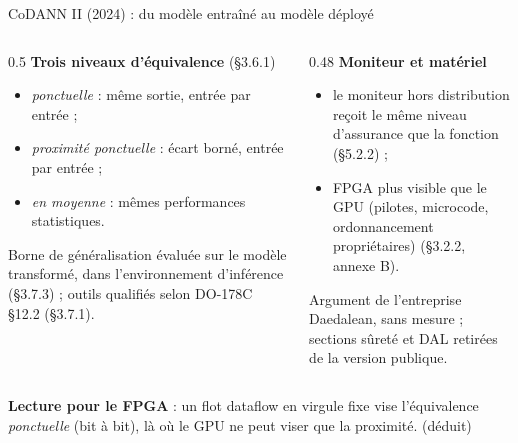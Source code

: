 \documentclass[aspectratio=169,11pt]{beamer}
\begin{document}
\begin{frame}{CoDANN II (2024) : du modèle entraîné au modèle déployé}
  \begin{columns}[T]
    \begin{column}{0.5\textwidth}
      \small
      \textbf{Trois niveaux d'équivalence} (§3.6.1)
      \begin{itemize}
        \item \emph{ponctuelle} : même sortie, entrée par entrée ;
        \item \emph{proximité ponctuelle} : écart borné, entrée par entrée ;
        \item \emph{en moyenne} : mêmes performances statistiques.
      \end{itemize}
      Borne de généralisation évaluée \alert{sur le modèle transformé}, dans
      l'environnement d'inférence (§3.7.3) ; outils qualifiés selon DO-178C §12.2 (§3.7.1).
    \end{column}
    \begin{column}{0.48\textwidth}
      \small
      \textbf{Moniteur et matériel}
      \begin{itemize}
        \item le moniteur hors distribution reçoit le même niveau d'assurance que la
              fonction (§5.2.2) ;
        \item FPGA plus visible que le GPU (pilotes, microcode, ordonnancement
              propriétaires) (§3.2.2, annexe B).
      \end{itemize}
      {\scriptsize\color{gray} Argument de l'entreprise Daedalean, sans mesure ; sections
      sûreté et DAL retirées de la version publique.}
    \end{column}
  \end{columns}

  \vspace{0.2em}
  \textbf{Lecture pour le FPGA} : un flot dataflow en virgule fixe vise l'équivalence
  \emph{ponctuelle} (bit à bit), là où le GPU ne peut viser que la proximité.
  {\scriptsize\color{acc}(déduit)}
\end{frame}
\end{document}
